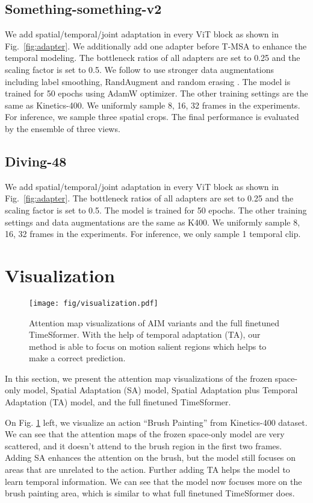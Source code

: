 \documentclass{article} \usepackage{iclr2023_conference,times}
\begin{document}
	\subsection{Something-something-v2}
	We add spatial/temporal/joint adaptation in every ViT block as shown in Fig.\ \ref{fig:adapter}. We additionally add one adapter before T-MSA to enhance the temporal modeling. The bottleneck ratios of all adapters are set to 0.25 and the scaling factor is set to 0.5. We follow \citet{liu2022videoswin} to use stronger data augmentations including label smoothing, RandAugment \citep{cubuk2020randaugment} and random erasing \citep{randomerasing}. The model is trained for 50 epochs using AdamW \citep{kingma2014adam} optimizer. The other training settings are the same as Kinetics-400. We uniformly sample 8, 16, 32 frames in the experiments. For inference, we sample three spatial crops. The final performance is evaluated by the ensemble of three views.
	
	\subsection{Diving-48}
	We add spatial/temporal/joint adaptation in every ViT block as shown in Fig.\ \ref{fig:adapter}. The bottleneck ratios of all adapters are set to 0.25 and the scaling factor is set to 0.5. The model is trained for 50 epochs. The other training settings and data augmentations are the same as K400. We uniformly sample 8, 16, 32 frames in the experiments. For inference, we only sample 1 temporal clip.
	
	\section{Visualization}
	\begin{figure}[t]
		\centering
		\texttt{[image: fig/visualization.pdf]}
\caption{Attention map visualizations of  AIM variants and the full finetuned TimeSformer. With the help of temporal adaptation (TA), our method is able to focus on motion salient regions which helps to make a correct prediction.}
		\label{fig:visual}
\end{figure}
	
	In this section, we present the attention map visualizations of the frozen space-only model, Spatial Adaptation (SA) model, Spatial Adaptation plus Temporal Adaptation (TA) model, and the full finetuned TimeSformer.
	
	On Fig. \ref{fig:visual} left, we visualize an action ``Brush Painting'' from Kinetics-400 dataset. 
	We can see that the attention maps of the frozen space-only model are very scattered, and it doesn't attend to the brush region in the first two frames. 
	Adding SA enhances the attention on the brush, but the model still focuses on areas that are unrelated to the action. 
	Further adding TA helps the model to learn temporal information. 
	We can see that the model now focuses more on the brush painting area, which is similar to what full finetuned TimeSformer does. 
	
\end{document}
